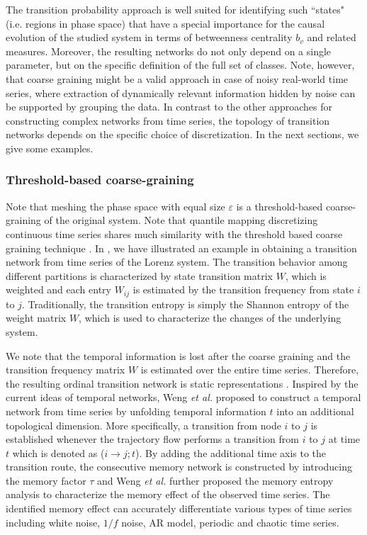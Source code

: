 	The transition probability approach is well suited for identifying such ``states" (i.e. regions in phase space) that have a special importance for the causal evolution of the studied system in terms of betweenness centrality $b_v$ and related measures. Moreover, the resulting networks do not only depend on a single parameter, but on the specific definition of the full set of classes. Note, however, that coarse graining might be a valid approach in case of noisy real-world time series, where extraction of dynamically relevant information hidden by noise can be supported by grouping the data. In contrast to the other approaches for constructing complex networks from time series, the topology of transition networks depends on the specific choice of discretization. In the next sections, we give some examples.
		
		\subsubsection{Threshold-based coarse-graining}
		Note that meshing the phase space with equal size $\varepsilon$ is a threshold-based coarse-graining of the original system. Note that quantile mapping discretizing continuous time series shares much similarity with the threshold based coarse graining technique \cite{Liu2016}. In \cite{Donner2011}, we have illustrated an example in obtaining a transition network from time series of the Lorenz system. The transition behavior among different partitions is characterized by state transition matrix $W$, which is weighted and each entry $W_{ij}$ is estimated by the transition frequency from state $i$ to $j$. Traditionally, the transition entropy is simply the Shannon entropy of the weight matrix $W$, which is used to characterize the changes of the underlying system. 
		
		We note that the temporal information is lost after the coarse graining and the transition frequency matrix $W$ is estimated over the entire time series. Therefore, the resulting ordinal transition network is static representations \cite{Weng2017}. Inspired by the current ideas of temporal networks, Weng {\emph {et al.}} proposed to construct a temporal network from time series by unfolding temporal information $t$ into an additional topological dimension. More specifically, a transition from node $i$ to $j$ is established whenever the trajectory flow performs a transition from $i$ to $j$ at time $t$ which is denoted as ($i \to j; t$). By adding the additional time axis to the transition route, the consecutive memory network is constructed by introducing the memory factor $\tau$ and Weng {\textit{ et al.}} further proposed the memory entropy analysis to characterize the memory effect of the observed time series. The identified memory effect can accurately differentiate various types of time series including white noise, $1/f$ noise, AR model, periodic and chaotic time series. 
		
